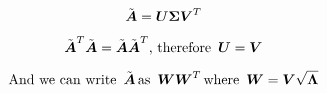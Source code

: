 \documentclass{article}
\begin{document}
\begin{equation*}
\tilde{\boldsymbol{A}} = \boldsymbol{U}\boldsymbol{\Sigma}\boldsymbol{V}^T
\end{equation*}

\begin{equation*}
\tilde{\boldsymbol{A}}^T\tilde{\boldsymbol{A}} = \tilde{\boldsymbol{A}}\tilde{\boldsymbol{A}}^T  \text{, therefore } \, \boldsymbol{U} = \boldsymbol{V}
\end{equation*}


\begin{equation*}
\text{And we can write } \, \tilde{\boldsymbol{A}} \, \text{as } \, \boldsymbol{W}\boldsymbol{W}^T \, \text{where } \, \boldsymbol{W} = \boldsymbol{V} \sqrt{\boldsymbol{\Lambda}}
\end{equation*}
\end{document}
